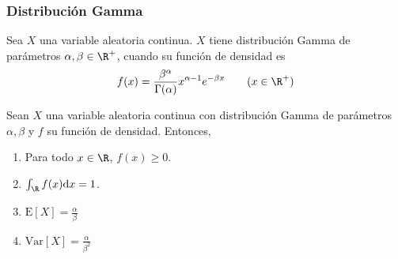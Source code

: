 \subsubsection{Distribución Gamma}
\begin{Def}
  Sea $X$ una variable aleatoria continua. $X$ tiene distribución Gamma
  de parámetros $\alpha,\beta\in\R^+$, cuando su función de densidad es
  \[
    f(x)=\frac{\beta^{\alpha}}{\Gamma(\alpha)}x^{\alpha-1}e^{-\beta x}
    \qquad (x\in\R^+)
  \]
\end{Def}
\begin{Teo}
  Sean $X$ una variable aleatoria continua con distribución Gamma
  de parámetros $\alpha,\beta$ y $f$
  su función de densidad. Entonces,
  \begin{enumerate}
    \item Para todo $x\in\R$, $f(x) \geq 0$.
    \item $\int_{\R}f(x)\mathrm{d}x=1$.
    \item $\text{E}[X]=\frac{\alpha}{\beta}$
    \item $\text{Var}[X]=\frac{\alpha}{\beta^2}$
  \end{enumerate}
\end{Teo}
